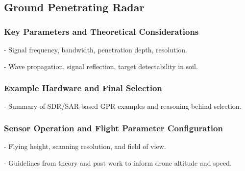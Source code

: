 \subsection{Ground Penetrating Radar}

\subsubsection{Key Parameters and Theoretical Considerations}
- Signal frequency, bandwidth, penetration depth, resolution.

- Wave propagation, signal reflection, target detectability in soil.

\subsubsection{Example Hardware and Final Selection}
- Summary of SDR/SAR-based GPR examples and reasoning behind selection.

\subsubsection{Sensor Operation and Flight Parameter Configuration}
- Flying height, scanning resolution, and field of view.

- Guidelines from theory and past work to inform drone altitude and speed.